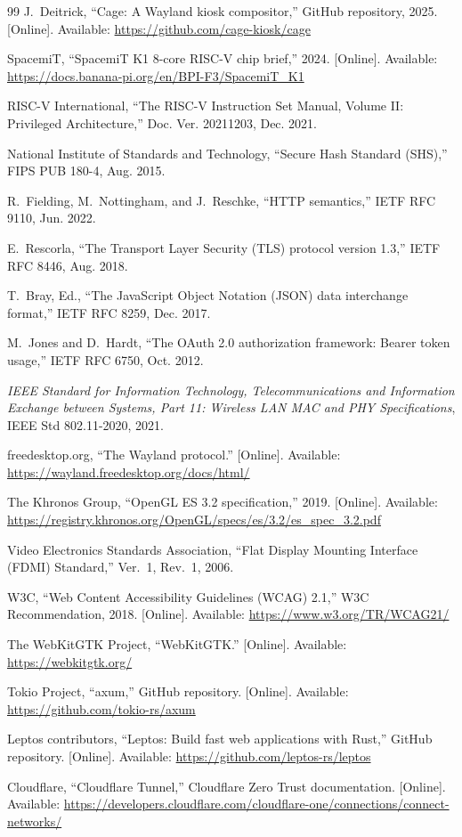 \documentclass[11pt]{article}
\begin{document}
\begin{thebibliography}{99}
J.~Deitrick, ``Cage: A Wayland kiosk compositor,'' GitHub repository, 2025. [Online]. Available: \url{https://github.com/cage-kiosk/cage}

SpacemiT, ``SpacemiT K1 8-core RISC-V chip brief,'' 2024. [Online]. Available: \url{https://docs.banana-pi.org/en/BPI-F3/SpacemiT_K1}

RISC-V International, ``The RISC-V Instruction Set Manual, Volume II: Privileged Architecture,'' Doc. Ver. 20211203, Dec. 2021.

National Institute of Standards and Technology, ``Secure Hash Standard (SHS),'' FIPS PUB 180-4, Aug. 2015.

R.~Fielding, M.~Nottingham, and J.~Reschke, ``HTTP semantics,'' IETF RFC 9110, Jun. 2022.

E.~Rescorla, ``The Transport Layer Security (TLS) protocol version 1.3,'' IETF RFC 8446, Aug. 2018.

T.~Bray, Ed., ``The JavaScript Object Notation (JSON) data interchange format,'' IETF RFC 8259, Dec. 2017.

M.~Jones and D.~Hardt, ``The OAuth 2.0 authorization framework: Bearer token usage,'' IETF RFC 6750, Oct. 2012.

\emph{IEEE Standard for Information Technology, Telecommunications and Information Exchange between Systems, Part 11: Wireless LAN MAC and PHY Specifications}, IEEE Std 802.11-2020, 2021.

freedesktop.org, ``The Wayland protocol.'' [Online]. Available: \url{https://wayland.freedesktop.org/docs/html/}

The Khronos Group, ``OpenGL ES 3.2 specification,'' 2019. [Online]. Available: \url{https://registry.khronos.org/OpenGL/specs/es/3.2/es_spec_3.2.pdf}

Video Electronics Standards Association, ``Flat Display Mounting Interface (FDMI) Standard,'' Ver.~1, Rev.~1, 2006.

W3C, ``Web Content Accessibility Guidelines (WCAG) 2.1,'' W3C Recommendation, 2018. [Online]. Available: \url{https://www.w3.org/TR/WCAG21/}

The WebKitGTK Project, ``WebKitGTK.'' [Online]. Available: \url{https://webkitgtk.org/}

Tokio Project, ``axum,'' GitHub repository. [Online]. Available: \url{https://github.com/tokio-rs/axum}

Leptos contributors, ``Leptos: Build fast web applications with Rust,'' GitHub repository. [Online]. Available: \url{https://github.com/leptos-rs/leptos}

Cloudflare, ``Cloudflare Tunnel,'' Cloudflare Zero Trust documentation. [Online]. Available: \url{https://developers.cloudflare.com/cloudflare-one/connections/connect-networks/}
\end{thebibliography}
\end{document}
